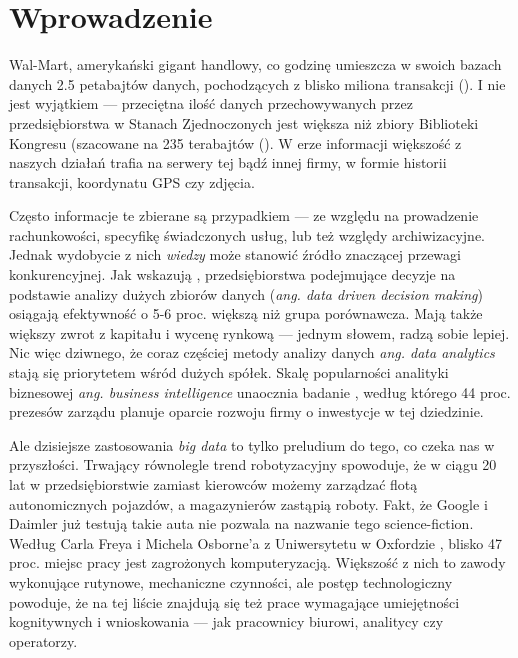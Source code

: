 \documentclass[polish, twoside, 12pt, a4paper]{article}
\theoremstyle{definition}
\theoremstyle{plain}
\theoremstyle{remark}
\begin{document}
\cleardoublepage
\section{Wprowadzenie}

Wal-Mart, amerykański gigant handlowy, co godzinę umieszcza w swoich bazach danych 2.5 petabajtów danych, pochodzących z blisko miliona transakcji (\cite{Economist2010}). I nie jest wyjątkiem --- przeciętna ilość danych przechowywanych przez przedsiębiorstwa w Stanach Zjednoczonych jest większa niż zbiory Biblioteki Kongresu (szacowane na 235 terabajtów (\cite{McKinsey2011}). W erze informacji większość z naszych działań trafia na serwery tej bądź innej firmy, w formie historii transakcji, koordynatu GPS czy zdjęcia. 

Często informacje te zbierane są przypadkiem --- ze względu na prowadzenie rachunkowości, specyfikę świadczonych usług, lub też względy archiwizacyjne. Jednak wydobycie z nich \textit{wiedzy} może stanowić źródło znaczącej przewagi konkurencyjnej.  Jak wskazują \cite{Brynjolfsson2011}, przedsiębiorstwa podejmujące decyzje na podstawie analizy dużych zbiorów danych (\textit{ang. data driven decision making}) osiągają efektywność o 5-6 proc. większą niż grupa porównawcza. Mają także większy zwrot z kapitału i wycenę rynkową --- jednym słowem, radzą sobie lepiej. Nic więc dziwnego, że coraz częściej metody analizy danych \textit{ang. data analytics} stają się priorytetem wśród dużych spółek. Skalę popularności analityki biznesowej \textit{ang. business intelligence} unaocznia badanie \cite{PwC2014}, według którego 44 proc. prezesów zarządu planuje oparcie rozwoju firmy o inwestycje w tej dziedzinie. 

Ale dzisiejsze zastosowania \textit{big data} to tylko preludium do tego, co czeka nas w przyszłości. Trwający równolegle trend robotyzacyjny spowoduje, że w ciągu 20 lat w przedsiębiorstwie zamiast kierowców możemy zarządzać flotą autonomicznych pojazdów, a magazynierów zastąpią roboty. Fakt, że Google i Daimler już testują takie auta nie pozwala na nazwanie tego science-fiction. Według Carla Freya i Michela Osborne'a z Uniwersytetu w Oxfordzie \cite{frey2013}, blisko 47 proc. miejsc pracy jest zagrożonych komputeryzacją. Większość z nich to zawody wykonujące rutynowe, mechaniczne czynności, ale postęp technologiczny powoduje, że na tej liście znajdują się też prace wymagające umiejętności kognitywnych i wnioskowania --- jak pracownicy biurowi, analitycy czy operatorzy. 
\end{document}

